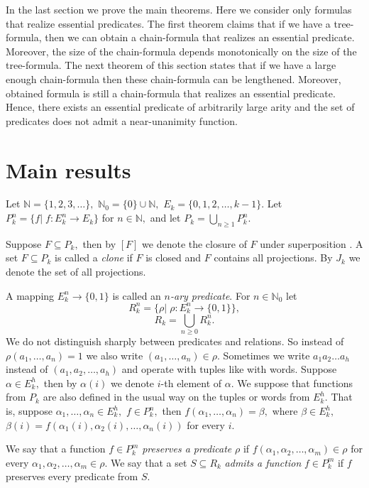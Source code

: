 \documentclass{au}
\theoremstyle{plain}
\theoremstyle{definition}
\theoremstyle{remark}
\numberwithin{equation}{section}
\begin{document}
In the last section we prove the main theorems.
Here we consider only formulas that realize essential predicates.
The first theorem claims that if we have a tree-formula, then we can obtain a
chain-formula that realizes an essential predicate.
Moreover, the size of the chain-formula depends monotonically on the size of the tree-formula.
The next theorem of this section states that
if we have a large enough chain-formula then these chain-formula can be lengthened.
Moreover, obtained formula is still a chain-formula that realizes an essential predicate.
Hence, there exists an essential predicate of arbitrarily large arity and the set of predicates does not admit
a near-unanimity function.

\section{Main results}

Let $\mathbb N = \{1,2,3,\ldots\},$
$\mathbb N_{0} = \{0\}\cup \mathbb N,$
$E_{k}=\{0,1,2,\ldots,k-1\}.$
Let $P_{k}^{n} = \{f|\; f: E_{k}^{n}\rightarrow E_{k}\}$ for $n\in \mathbb N,$
and let $P_{k} = \bigcup \limits_{n\ge 1} P_{k}^{n}.$

Suppose $F\subseteq P_{k},$ then by $[F]$ we denote the closure of $F$ under superposition \cite{lau}.
A set $F\subseteq P_{k}$ is called a \emph{clone} if
$F$ is closed and $F$ contains all projections.
By $J_{k}$ we denote the set of all projections.

A mapping $E_{k}^{n}\rightarrow \{0,1\}$ is called an \emph{$n$-ary predicate}.
For $n\in \mathbb N_{0}$ let
$$R_{k}^{n} = \{\rho|\; \rho: E_{k}^{n}\rightarrow \{0,1\}\},$$
$$R_{k} = \bigcup \limits_{n\ge 0} R_{k}^{n}.$$
We do not distinguish sharply between predicates and relations. So instead of
$\rho(a_{1},\ldots,a_{n}) = 1$  we also write $(a_{1},\ldots,a_{n})\in \rho.$
Sometimes we write
$a_{1}a_{2}\ldots a_{h}$ instead of
$(a_{1},a_{2},\ldots,a_{h})$
and operate with tuples like with words.
Suppose $\alpha\in E_{k}^{h},$ then by $\alpha(i)$ we denote
$i$-th element of $\alpha.$
We suppose that functions from $P_{k}$ are also defined in the usual way on the tuples or words
from $E_{k}^{h}.$
That is, suppose $\alpha_{1},\ldots,\alpha_{n} \in E_{k}^{h},$ $f\in P_{k}^{n},$
then $f(\alpha_{1},\ldots,\alpha_{n}) = \beta,$
where $\beta \in E_{k}^{h},$ $\beta(i) = f(\alpha_{1}(i),\alpha_{2}(i),\ldots,\alpha_{n}(i))$
for every $i.$

We say that a function $f\in P_{k}^{m}$ \emph{preserves a predicate} $\rho$
if
$f(\alpha_{1},\alpha_{2},\ldots,\alpha_{m}) \in \rho$
for every $\alpha_{1},\alpha_{2},\ldots,\alpha_{m}\in \rho.$
We say that a set $S\subseteq R_{k}$ \emph{admits a function} $f\in P_{k}^{m}$
if $f$ preserves every predicate from $S.$
\end{document}

